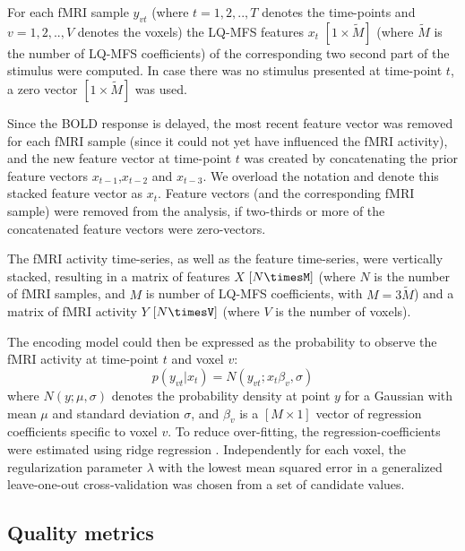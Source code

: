 

For each f{MRI} sample $y_{vt}$ (where $t=1,2,..,T$ denotes the time-points and
$v=1,2,..,V$ denotes the voxels) the LQ-MFS features $x_{t}$ $[1\times\widetilde{M}]$
(where $\widetilde{M}$ is the number of LQ-MFS coefficients) of the
corresponding two second part of the stimulus were computed. In case there was
no stimulus presented at time-point $t$, a zero vector $[1\times\widetilde{M}]$ was
used. 

Since the BOLD response is delayed,  the most recent feature vector was removed
for each f{MRI} sample (since it could not yet have influenced the f{MRI}
activity), and the new feature vector at time-point $t$ was created by
concatenating the prior feature vectors $x_{t-1}$,$x_{t-2}$ and $x_{t-3}$. We
overload  the notation and denote this stacked feature vector as $x_{t}$.
Feature vectors (and the corresponding f{MRI} sample) were removed from the
analysis, if two-thirds or more of the concatenated feature vectors were
zero-vectors.

The f{MRI} activity time-series, as well as the feature time-series, were
vertically stacked, resulting in a matrix of features $X$ $[N\timesM]$ (where $N$ is
the number of f{MRI} samples, and $M$ is number of LQ-MFS coefficients, with
$M=3\widetilde{M}$) and a matrix of f{MRI} activity $Y$ $[N\timesV]$ (where $V$ is
the number of voxels).

The encoding model could then be expressed as the probability to observe the f{MRI} activity at time-point $t$ and voxel $v$:
%
\begin{equation}
  \label{eq:encmo}
  p(y_{vt}|x_{t}) = N(y_{vt};x_{t}\beta_{v},\sigma)
\end{equation}
%
where $N(y;\mu,\sigma)$ denotes the probability density at point $y$ for a
Gaussian with mean $\mu$ and standard deviation $\sigma$, and $\beta_{v}$ is a
$[M\times1]$ vector of regression coefficients specific to voxel $v$. To reduce
over-fitting, the regression-coefficients were estimated using ridge regression
\citep{HK70}.  Independently for each voxel, the regularization parameter
$\lambda$ with the lowest mean squared error in a generalized leave-one-out
cross-validation \citep{GHW79} was chosen from a set of candidate values.

\subsection*{Quality metrics} 

